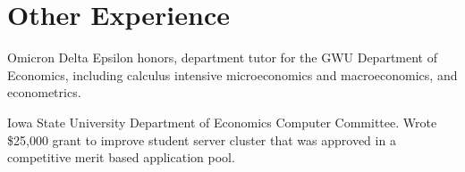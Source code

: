 \documentclass[letterpaper]{article}
\renewenvironment{itemize}{
  \begin{list}{}{
    \setlength{\leftmargin}{0em}
  }
}{
  \end{list}
}
\begin{document}
\section*{Other Experience}
\begin{itemize}
\item Omicron Delta Epsilon honors, department tutor for the GWU Department of Economics, including calculus intensive microeconomics and macroeconomics, and econometrics.
\item Iowa State University Department of Economics Computer Committee. Wrote \$25,000 grant to improve student server cluster that was approved in a competitive merit based application pool.
\end{itemize}
\end{document}
